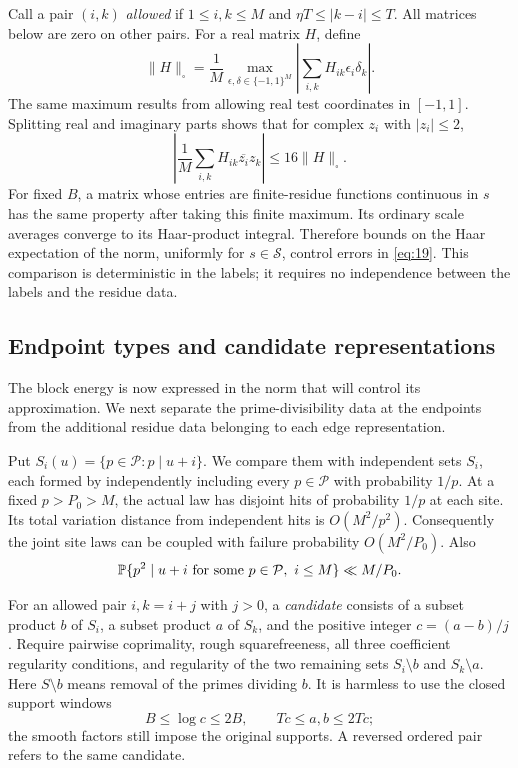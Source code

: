 Call a pair $(i,k)$ \emph{allowed} if
$1\le i,k\le M$ and $\eta T\le|k-i|\le T$. All matrices below are
zero on other pairs. For a real matrix $H$, define
\begin{equation}\label{eq:graph-cutnorm}
 \|H\|_\square=
 \frac1M\max_{\epsilon,\delta\in\{-1,1\}^M}
 \left|\sum_{i,k}H_{ik}\epsilon_i\delta_k\right|.
\end{equation}
The same maximum results from allowing real test coordinates in
$[-1,1]$. Splitting real and imaginary parts shows that for complex
$z_i$ with $|z_i|\le2$,
\begin{equation}\label{eq:graph-cut-labels}
 \left|\frac1M\sum_{i,k}H_{ik}\overline{z_i}z_k\right|
 \le16\|H\|_\square.
\end{equation}
For fixed $B$, a matrix whose entries are finite-residue functions
continuous in $s$ has the same property after taking this finite
maximum. Its ordinary scale averages converge to its Haar-product
integral. Therefore bounds on the Haar expectation of the norm,
uniformly for $s\in\mathcal S$, control errors in
\eqref{eq:19}. This comparison is deterministic in the labels; it
requires no independence between the labels and the residue data.

\subsection{Endpoint types and candidate representations}

The block energy is now expressed in the norm that will control its
approximation. We next separate the prime-divisibility data at the endpoints
from the additional residue data belonging to each edge representation.

Put $S_i(u)=\{p\in\mathcal P:p\mid u+i\}$. We compare them with
independent sets $S_i$, each formed by independently including every
$p\in\mathcal P$ with probability $1/p$. At a fixed $p>P_0>M$,
the actual law has disjoint hits of probability $1/p$ at each site.
Its total variation distance from independent hits is
$O(M^2/p^2)$. Consequently the joint site laws can be coupled with
failure probability $O(M^2/P_0)$. Also
\begin{equation}\label{eq:graph-site-squares}
 \mathbb P\{p^2\mid u+i\text{ for some }p\in\mathcal P,\ i\le M\}
 \ll M/P_0.
\end{equation}

For an allowed pair $i,k=i+j$ with $j>0$, a \emph{candidate}
consists of a subset product $b$ of $S_i$, a subset product $a$ of
$S_k$, and the positive integer $c=(a-b)/j$. Require pairwise
coprimality, rough squarefreeness, all three coefficient regularity
conditions, and regularity of the two remaining sets
$S_i\setminus b$ and $S_k\setminus a$. Here $S\setminus b$
means removal of the primes dividing $b$. It is harmless to use
the closed support windows
\[
 B\le\log c\le2B,\qquad Tc\le a,b\le2Tc;
\]
the smooth factors still impose the original supports. A reversed
ordered pair refers to the same candidate.

